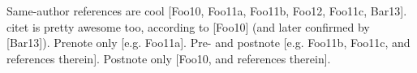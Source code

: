 \documentclass{article}
\begin{document}
Same-author references are cool [Foo10, Foo11a, Foo11b, Foo12, Foo11c, Bar13].
citet is pretty awesome too, according to [Foo10] (and later confirmed by [Bar13]).
Prenote only [e.g. Foo11a].
Pre- and postnote [e.g. Foo11b, Foo11c, and references therein].
Postnote only [Foo10, and references therein].

\nocite{foo2010,foo2011lorem,foo2011ipsum,foo2012,foo2011dolor,bar2013}
\end{document}
